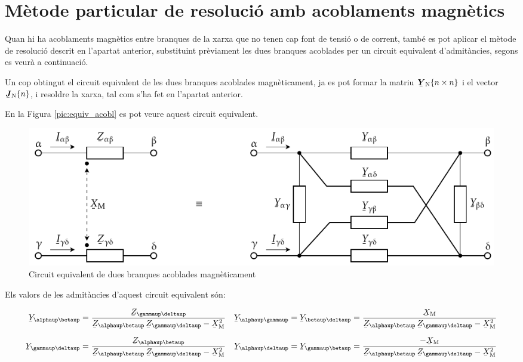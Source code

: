 \section{M\`{e}tode particular de resoluci\'{o} amb acoblaments magn\`{e}tics}

Quan hi ha acoblaments magn\`{e}tics entre branques de la xarxa que no
tenen cap font de tensi\'{o} o de corrent, tamb\'{e} es pot aplicar el
m\`{e}tode de resoluci\'{o} descrit en l'apartat anterior, substituint
pr\`{e}viament les dues branques acoblades per un circuit equivalent
d'admit\`{a}ncies, segons es veur\`{a} a continuaci\'{o}.

Un cop obtingut el circuit equivalent de les dues branques acoblades
magn\`{e}ticament, ja es pot formar la matriu $\mcmplx{Y}\ped{N}\{n \times n\}$ i
el vector $\mcmplx{J}\ped{N}\{n\}$, i  resoldre la xarxa, tal com s'ha fet en
l'apartat anterior.

En la Figura \vref{pic:equiv_acobl} es pot veure aquest circuit
equivalent.
\begin{figure}[htb]
\centering
    \includegraphics{Imatges/Cap-ResXarxElec-Acoblament.pdf}
   \caption{Circuit equivalent de dues branques acoblades magn\`{e}ticament} \label{pic:equiv_acobl}
\end{figure}

Els valors de les admit\`{a}ncies d'aquest circuit equivalent
s\'{o}n:

\parbox{15cm}
{ \begin{align*}
   \cmplx{Y}_{\alphaup\betaup} &= \frac{\cmplx{Z}_{\gammaup\deltaup}}{\cmplx{Z}_{\alphaup\betaup}\, \cmplx{Z}_{\gammaup\deltaup}-\cmplx{X}\ped{M}^2} &
   \cmplx{Y}_{\alphaup\gammaup} &= \cmplx{Y}_{\betaup\deltaup} = \frac{\cmplx{X}\ped{M}}{\cmplx{Z}_{\alphaup\betaup}\, \cmplx{Z}_{\gammaup\deltaup}-\cmplx{X}\ped{M}^2} \\[1.5ex]
   \cmplx{Y}_{\gammaup\deltaup} &= \frac{\cmplx{Z}_{\alphaup\betaup}}{\cmplx{Z}_{\alphaup\betaup}\, \cmplx{Z}_{\gammaup\deltaup}-\cmplx{X}\ped{M}^2} &
   \cmplx{Y}_{\alphaup\deltaup} &= \cmplx{Y}_{\gammaup\betaup} = \frac{-\cmplx{X}\ped{M}}{\cmplx{Z}_{\alphaup\betaup}\, \cmplx{Z}_{\gammaup\deltaup}-\cmplx{X}\ped{M}^2}
\end{align*} }
\hfill
\parbox{1cm}{\begin{align}\end{align}}

